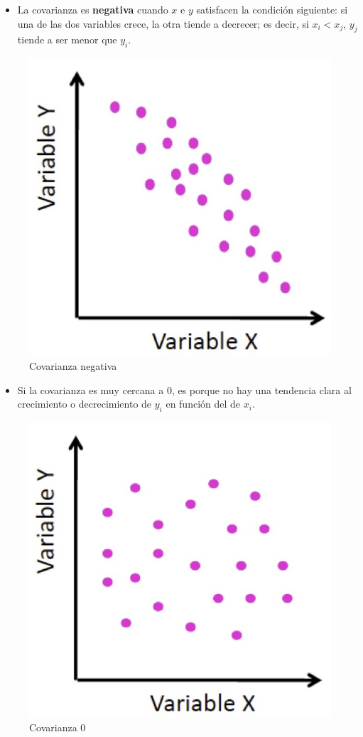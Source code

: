 \documentclass[
]{book}
\providecommand{\tightlist}{%
  \setlength{\itemsep}{0pt}\setlength{\parskip}{0pt}}
\theoremstyle{definition}
\theoremstyle{definition}
\theoremstyle{definition}
\theoremstyle{definition}
\theoremstyle{remark}
\begin{document}
\begin{itemize}
\tightlist
\item
  La covarianza es \textbf{negativa} cuando \(x\) e \(y\) satisfacen la condición siguiente: si una de las dos variables crece, la otra tiende a decrecer; es decir, si \(x_i<x_j\), \(y_j\) tiende a ser menor que \(y_i\).
\end{itemize}

\begin{figure}

{\centering \includegraphics[width=0.5\linewidth]{INREMDN_files/figure-html/covneq} 

}

\caption{Covarianza negativa}\label{fig:unnamed-chunk-307}
\end{figure}

\begin{itemize}
\tightlist
\item
  Si la covarianza es muy cercana a 0, es porque no hay una tendencia clara al crecimiento o decrecimiento de \(y_i\) en función del de \(x_i\).
\end{itemize}

\begin{figure}

{\centering \includegraphics[width=0.5\linewidth]{INREMDN_files/figure-html/cov0} 

}

\caption{Covarianza 0}\label{fig:unnamed-chunk-308}
\end{figure}
\end{document}
